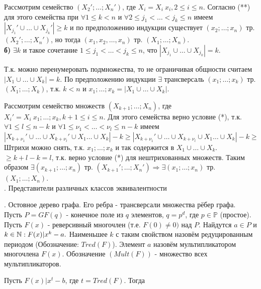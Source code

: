 Рассмотрим семейство $(X_2'; \dots; X_n')$, где $X_i=X_i \ {x_i}, 2 \leq i \leq n$.
Согласно (**) для этого семейства при $\forall 1 \leq k < n$ и $\forall 2 \leq j_1 < \dots < j_k \leq n$ имеем $|X_{j_1}' \cup \dots \cup X_{j_k}'| \geq k$ и по предположению индукции существует $(x_2; \dots; x_n)$ тр. $(X_2'; \dots; X_n')$, но тогда $(x_1, x_2, \dots, x_n)$ тр. $(X_1; \dots; X_n)$.\\

\textbf{б)} $\exists k$ и такое сочетание $1 \leq j_1 < \dots < j_k \leq n$, что $|X_{j_1} \cup \dots \cup X_{j_k}|=k$.

Т.к. можно перенумеровать подмножества, то не ограничивая общности считаем $|X_1 \cup \dots \cup X_k|=k$. По предположению индукции $\exists$ трансверсаль $(x_1; \dots; x_k)$ тр. $(X_1; \dots; X_k)$, т.к. $k<n$ и ${x_1;\dots;x_k}=|X_1 \cup \dots \cup X_k|$.

Рассмотрим семейство множеств $(X_{k+1}; \dots; X_n)$, где $X_i'=X_i \ {x_1;\dots;x_k}, k+1 \leq i \leq n$. Для этого семейства верно условие (*), т.к. $\forall 1 \leq l \leq n-k$ и $\forall 1 \leq \nu_1 < \dots < \nu_l \leq n-k$ имеем $|X_{k+{\nu_1}}' \cup \dots \cup X_{k+{\nu_l}}' \cup X_1 \dots \cup X_k|-k \geq |X_{k+{\nu_1}}' \cup \dots \cup X_{k+{\nu_l}} \cup X_1 \dots \cup X_k|-k \geq$
Штрихи можно снять, т.к. ${x_1; \dots; x_k}$ и так содержится в $X_1 \cup \dots \cup X_k$.
$\geq k+l-k=l$, т.к. верно условие (*) для нештрихованных множеств. Таким образом $\exists  (x_{k+1}; \dots; x_n)$ тр. $(X_{k+1}'; \dots; X_n') \Rightarrow \exists (x_1; \dots; x_n)$ тр. $(X_1; \dots; X_n)$.\\

. Представители различных классов эквивалентности

. Остовное дерево графа. Его ребра - трансверсали множества рёбер графа.\\

\opr Пусть $P=GF(q)$ - конечное поле из $q$ элементов, $q=p^d$, где $p \in \mathbb{P}$ (простое). Пусть $F(x)$ - реверсивный многочлен (т.е. $F(0) \neq 0 )$ над $P$. Найдутся $a \in P$ и $k \in \mathbb{N} : F(x)| x^k - a.$ Наименьшее $k$ с таким свойством назовём редуцированным периодом (Обозначение: $Tred(F)$). Элемент $a$ назовём мультипликатором многочлена $F(x)$. Обозначение $(Mult(F))$ - множество всех мультипликаторов.

Пусть $F(x)|x^t - b$, где $t = Tred(F)$. Тогда

\utv \\

